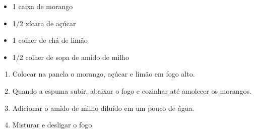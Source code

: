 {
	\begin{itemize}
		\item 1 caixa de morango
		\item 1/2 xícara de açúcar
		\item 1 colher de chá de limão
		\item 1/2 colher de sopa de amido de milho
	\end{itemize}
}{
	\begin{enumerate}
		\item Colocar na panela o morango, açúcar e limão em fogo alto.
		\item Quando a espuma subir, abaixar o fogo e cozinhar até amolecer os morangos.
		\item Adicionar o amido de milho diluído em um pouco de água.
		\item Misturar e desligar o fogo
	\end{enumerate}
}